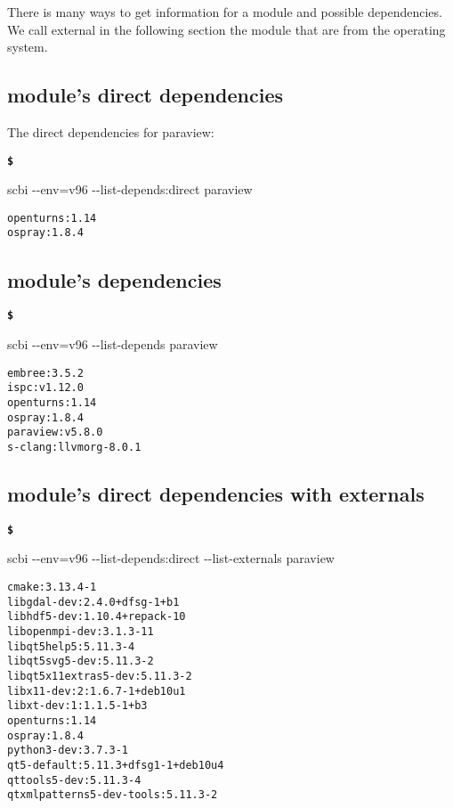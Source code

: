 \documentclass[a4paper,12pt,twoside]{article}
\newenvironment{shellcommand}{
	\begin{list}{ %
			\bfseries\texttt \$
		}{ %
			\ttfamily
			\setlength{\topsep}{-0.3ex}
			\setlength{\labelwidth}{1in}
			\setlength{\leftmargin}{0.7in}
			\setlength{\labelsep}{0.5ex}
			\setlength{\rightmargin}{0.5in}
			\setlength{\itemsep}{1ex}
			\setlength{\parsep}{0ex}
			\setlength{\listparindent}{0.5in}
		}
	}{
	\end{list}
}
\newcommand{\ddash}{-{}-}
\begin{document}
There is many ways to get information for a module and possible dependencies. We call external in the following section the module that are from the operating system.

\subsection{module's direct dependencies}

The direct dependencies for paraview:

\begin{shellcommand}
	\item scbi \ddash{}env=v96 \ddash{}list-depends:direct paraview
\end{shellcommand}

\begin{lstlisting}
openturns:1.14
ospray:1.8.4
\end{lstlisting}

\subsection{module's dependencies}

\begin{shellcommand}
	\item scbi \ddash{}env=v96 \ddash{}list-depends paraview
\end{shellcommand}

\begin{lstlisting}
embree:3.5.2
ispc:v1.12.0
openturns:1.14
ospray:1.8.4
paraview:v5.8.0
s-clang:llvmorg-8.0.1
\end{lstlisting}

\subsection{module's direct dependencies with externals}

\begin{shellcommand}
	\item scbi \ddash{}env=v96 \ddash{}list-depends:direct \ddash{}list-externals paraview
\end{shellcommand}

\begin{lstlisting}
cmake:3.13.4-1
libgdal-dev:2.4.0+dfsg-1+b1
libhdf5-dev:1.10.4+repack-10
libopenmpi-dev:3.1.3-11
libqt5help5:5.11.3-4
libqt5svg5-dev:5.11.3-2
libqt5x11extras5-dev:5.11.3-2
libx11-dev:2:1.6.7-1+deb10u1
libxt-dev:1:1.1.5-1+b3
openturns:1.14
ospray:1.8.4
python3-dev:3.7.3-1
qt5-default:5.11.3+dfsg1-1+deb10u4
qttools5-dev:5.11.3-4
qtxmlpatterns5-dev-tools:5.11.3-2
\end{lstlisting}
\end{document}
